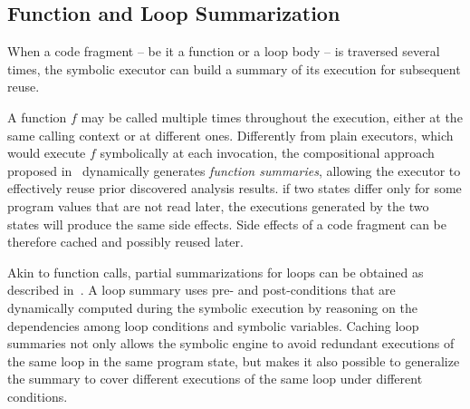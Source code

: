 \subsection{Function and Loop Summarization} 
\label{ss:summarization}

When a code fragment -- be it a function or a loop body --  is traversed several times, the symbolic executor can build a summary of its execution for subsequent reuse.

A function $f$ may be called multiple times throughout the execution, either at the same calling context or at different ones. Differently from plain executors, which would execute $f$ symbolically at each invocation, the compositional approach proposed in~\cite{G-POPL07} dynamically generates {\em function summaries}, allowing  the executor to effectively reuse prior discovered analysis results. 
if two states differ only for some program values that are not read later, the executions generated by the two states will produce the same side effects. Side effects of a code fragment can be therefore cached and possibly reused later.

Akin to function calls, partial summarizations for loops can be obtained as described in~\cite{GL-ISSTA11}. A loop summary uses pre- and post-conditions that are dynamically computed  during the symbolic execution by reasoning on the dependencies among loop conditions and symbolic variables. Caching loop summaries not only allows the symbolic engine to avoid redundant executions of the same loop in the same program state, but  makes it also possible to generalize the summary to cover different executions of the same loop under different conditions. 

